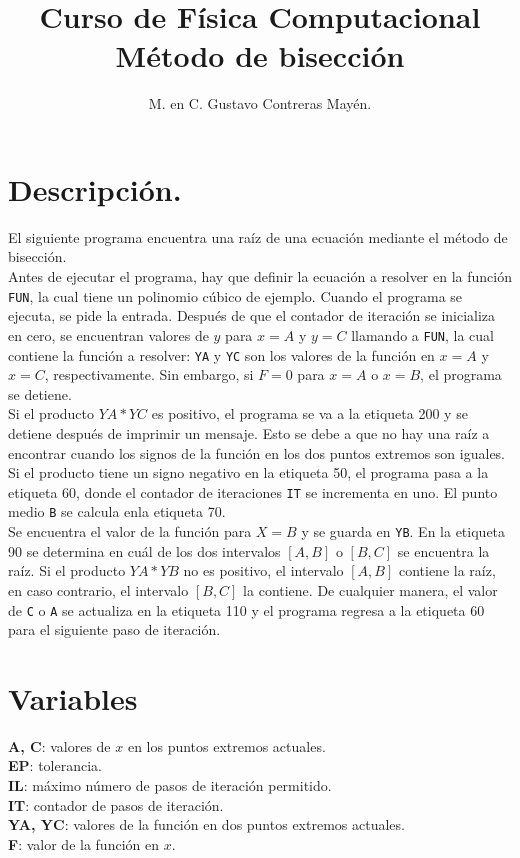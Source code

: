 \documentclass[12pt]{article}
\author{M. en C. Gustavo Contreras Mayén.}
\title{Curso de Física Computacional \\ Método de bisección}
\date{ }
\begin{document}
\maketitle
\section{Descripción.}
El siguiente programa encuentra una raíz de una ecuación mediante el método de bisección.\\
Antes de ejecutar el programa, hay que definir la ecuación a resolver en la función \texttt{FUN}, la cual tiene un polinomio cúbico de ejemplo. Cuando el programa se ejecuta, se pide la entrada. Después de que el contador de iteración se inicializa en cero, se encuentran valores de $y$ para $x=A$ y $y=C$ llamando a \texttt{FUN}, la cual contiene la función a resolver: \texttt{YA} y \texttt{YC} son los valores de la función en $x=A$ y $x=C$, respectivamente. Sin embargo, si $F=0$ para $x=A$ o $x=B$, el programa se detiene.\\
Si el producto $YA*YC$ es positivo, el programa se va a la etiqueta 200 y se detiene después de imprimir un mensaje. Esto se debe a que no hay una raíz a encontrar cuando los signos de la función en los dos puntos extremos son iguales. Si el producto tiene un signo negativo en la etiqueta 50, el programa pasa a la etiqueta 60, donde el contador de iteraciones \texttt{IT} se incrementa en uno. El punto medio \texttt{B} se calcula enla etiqueta 70.\\
Se encuentra el valor de la función para $X=B$ y se guarda en \texttt{YB}. En la etiqueta 90 se determina en cuál de los dos intervalos $[A,B]$ o $[B,C]$ se encuentra la raíz. Si el producto $YA*YB$ no es positivo, el intervalo $[A,B]$ contiene la raíz, en caso contrario, el intervalo $[B,C]$ la contiene. De cualquier manera, el valor de \texttt{C} o \texttt{A} se actualiza en la etiqueta 110 y el programa regresa a la etiqueta 60 para el siguiente paso de iteración.
\\
\section{Variables}
\textbf{A, C}: valores de $x$ en los puntos extremos actuales. \\
\textbf{EP}: tolerancia.\\
\textbf{IL}: máximo número de pasos de iteración permitido. \\
\textbf{IT}: contador de pasos de iteración.\\
\textbf{YA, YC}: valores de la función en dos puntos extremos actuales.\\
\textbf{F}: valor de la función en $x$.
\end{document}
